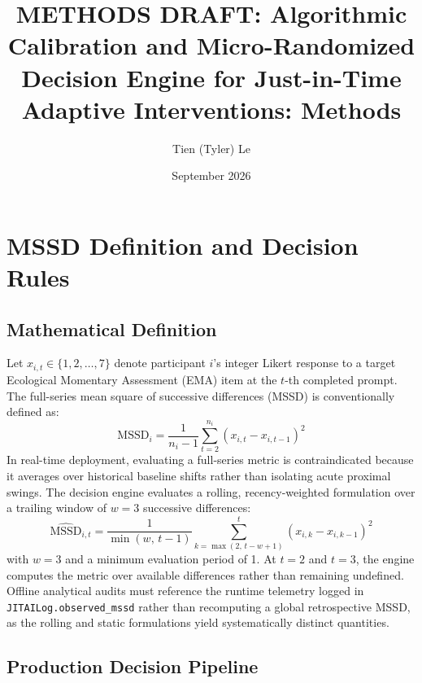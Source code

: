 \documentclass[11pt,letterpaper]{article}
\title{\textbf{METHODS DRAFT: Algorithmic Calibration and Micro-Randomized Decision Engine for Just-in-Time Adaptive Interventions: Methods}}
\author{Tien (Tyler) Le}
\date{September 2026}
\begin{document}
\maketitle

\section{MSSD Definition and Decision Rules}

\subsection{Mathematical Definition}

Let $x_{i,t} \in \{1, 2, \dots, 7\}$ denote participant $i$'s integer Likert response to a target Ecological Momentary Assessment (EMA) item at the $t$-th completed prompt. The full-series mean square of successive differences (MSSD) is conventionally defined as:
\begin{equation}
\text{MSSD}_i = \frac{1}{n_i - 1} \sum_{t=2}^{n_i} (x_{i,t} - x_{i,t-1})^2
\end{equation}
In real-time deployment, evaluating a full-series metric is contraindicated because it averages over historical baseline shifts rather than isolating acute proximal swings. The decision engine evaluates a rolling, recency-weighted formulation over a trailing window of $w = 3$ successive differences:
\begin{equation}
\widehat{\text{MSSD}}_{i,t} = \frac{1}{\min(w,\, t - 1)} \sum_{k=\max(2,\, t - w + 1)}^{t} (x_{i,k} - x_{i,k-1})^2
\end{equation}
with $w = 3$ and a minimum evaluation period of 1. At $t = 2$ and $t = 3$, the engine computes the metric over available differences rather than remaining undefined. Offline analytical audits must reference the runtime telemetry logged in \texttt{JITAILog.observed\_mssd} rather than recomputing a global retrospective MSSD, as the rolling and static formulations yield systematically distinct quantities.

\subsection{Production Decision Pipeline}
\end{document}
